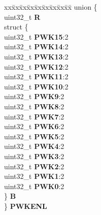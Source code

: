 \begin{DoxyCompactItemize}
\begin{tabbing}
\end{tabbing}\item 
\mbox{\label{structCRP__tag_ac285c9429aadfa6b3fa2b2af899a4067}} 
\begin{tabbing}
xx\=xx\=xx\=xx\=xx\=xx\=xx\=xx\=xx\=\kill
union \{\\
\>uint32\_t {\bfseries R}\\
\>struct \{\\
\>\>uint32\_t {\bfseries PWK15}:2\\
\>\>uint32\_t {\bfseries PWK14}:2\\
\>\>uint32\_t {\bfseries PWK13}:2\\
\>\>uint32\_t {\bfseries PWK12}:2\\
\>\>uint32\_t {\bfseries PWK11}:2\\
\>\>uint32\_t {\bfseries PWK10}:2\\
\>\>uint32\_t {\bfseries PWK9}:2\\
\>\>uint32\_t {\bfseries PWK8}:2\\
\>\>uint32\_t {\bfseries PWK7}:2\\
\>\>uint32\_t {\bfseries PWK6}:2\\
\>\>uint32\_t {\bfseries PWK5}:2\\
\>\>uint32\_t {\bfseries PWK4}:2\\
\>\>uint32\_t {\bfseries PWK3}:2\\
\>\>uint32\_t {\bfseries PWK2}:2\\
\>\>uint32\_t {\bfseries PWK1}:2\\
\>\>uint32\_t {\bfseries PWK0}:2\\
\>\} {\bfseries B}\\
\} {\bfseries PWKENL}\\


\end{tabbing}
\end{DoxyCompactItemize}
